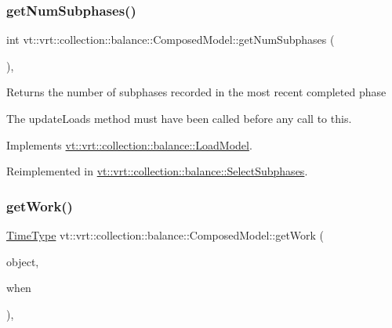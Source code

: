 \mbox{\label{classvt_1_1vrt_1_1collection_1_1balance_1_1_composed_model_af3ea09828c281d9c278198a19fe4e533}} 
\subsubsection{\texorpdfstring{get\+Num\+Subphases()}{getNumSubphases()}}
{\footnotesize\ttfamily int vt\+::vrt\+::collection\+::balance\+::\+Composed\+Model\+::get\+Num\+Subphases (\begin{DoxyParamCaption}{ }\end{DoxyParamCaption})\hspace{0.3cm}{\ttfamily [override]}, {\ttfamily [virtual]}}

Returns the number of subphases recorded in the most recent completed phase

The {\ttfamily update\+Loads} method must have been called before any call to this. 

Implements \hyperlink{classvt_1_1vrt_1_1collection_1_1balance_1_1_load_model_ab46ea62e4228d4a64de9dd0adfe81af2}{vt\+::vrt\+::collection\+::balance\+::\+Load\+Model}.



Reimplemented in \hyperlink{classvt_1_1vrt_1_1collection_1_1balance_1_1_select_subphases_a347673e0bbc4ded04f32d97fea8f5b68}{vt\+::vrt\+::collection\+::balance\+::\+Select\+Subphases}.

\mbox{\label{classvt_1_1vrt_1_1collection_1_1balance_1_1_composed_model_a5de9a43648cfd18ca00f1f0a6c61be4d}} 
\subsubsection{\texorpdfstring{get\+Work()}{getWork()}}
{\footnotesize\ttfamily \hyperlink{namespacevt_a876a9d0cd5a952859c72de8a46881442}{Time\+Type} vt\+::vrt\+::collection\+::balance\+::\+Composed\+Model\+::get\+Work (\begin{DoxyParamCaption}\item[{\hyperlink{namespacevt_1_1vrt_1_1collection_1_1balance_a14c8d2c972f2913aa3f1636e5be0a120}{Element\+I\+D\+Type}}]{object,  }\item[{\hyperlink{structvt_1_1vrt_1_1collection_1_1balance_1_1_phase_offset}{Phase\+Offset}}]{when }\end{DoxyParamCaption})\hspace{0.3cm}{\ttfamily [override]}, {\ttfamily [virtual]}}



